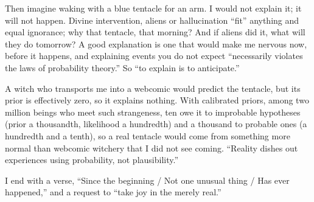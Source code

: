 Then imagine waking with a blue tentacle for an arm. I would not explain it; it will not happen. Divine intervention, aliens or hallucination ``fit'' anything and equal ignorance; why that tentacle, that morning? And if aliens did it, what will they do tomorrow? A good explanation is one that would make me nervous now, before it happens, and explaining events you do not expect ``necessarily violates the laws of probability theory.'' So ``to explain is to anticipate.''

A witch who transports me into a webcomic would predict the tentacle, but its prior is effectively zero, so it explains nothing. With calibrated priors, among two million beings who meet such strangeness, ten owe it to improbable hypotheses (prior a thousandth, likelihood a hundredth) and a thousand to probable ones (a hundredth and a tenth), so a real tentacle would come from something more normal than webcomic witchery that I did not see coming. ``Reality dishes out experiences using probability, not plausibility.'' 

I end with a verse, ``Since the beginning / Not one unusual thing / Has ever happened,'' and a request to ``take joy in the merely real.''
